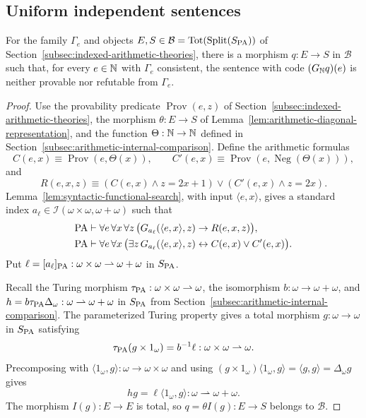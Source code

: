 \subsection{Uniform independent sentences}
\label{subsec:uniform-independent-sentences}

\begin{theorem}
\label{thm:uniform-independent-sentences}
For the family $\Gamma_e$ and objects
$E,S\in\mathcal B=\operatorname{Tot}(\operatorname{Split}(S_{\mathrm{PA}}))$ of
Section~\ref{subsec:indexed-arithmetic-theories}, there is a morphism
$q:E\to S$ in $\mathcal B$ such that,
for every $e\in\mathbb N$ with $\Gamma_e$ consistent, the
sentence with code $(G_{\mathbb N}q)(e)$ is neither provable nor
refutable from $\Gamma_e$.
\end{theorem}
\begin{proof}
Use the provability predicate $\operatorname{Prov}(e,z)$ of
Section~\ref{subsec:indexed-arithmetic-theories}, the morphism
$\theta:E\to S$ of Lemma~\ref{lem:arithmetic-diagonal-representation},
and the function $\Theta:\mathbb N\to\mathbb N$ defined in
Section~\ref{subsec:arithmetic-internal-comparison}.
Define the arithmetic formulas
\[
 C(e,x)\equiv\operatorname{Prov}(e,\Theta(x)),\qquad
 C'(e,x)\equiv\operatorname{Prov}(e,\operatorname{Neg}(\Theta(x))),
\]
and
\[
 R(e,x,z)\equiv
   (C(e,x)\land z=2x+1)\lor(C'(e,x)\land z=2x).
\]
Lemma~\ref{lem:syntactic-functional-search}, with input
$\langle e,x\rangle$, gives a standard index
$a_\ell\in\mathcal I(\omega\times\omega,\omega+\omega)$
such that
\[
 \begin{aligned}
 \mathrm{PA}&\vdash\forall e\,\forall x\,\forall z\,
   \bigl(G_{a_\ell}(\langle e,x\rangle,z)\to R(e,x,z)\bigr),\\
 \mathrm{PA}&\vdash\forall e\,\forall x\,
   \bigl(\exists z\,G_{a_\ell}(\langle e,x\rangle,z)
                     \leftrightarrow C(e,x)\lor C'(e,x)\bigr).
 \end{aligned}
\]
Put $\ell=[a_\ell]_{\mathrm{PA}}:\omega\times\omega\rightharpoonup
\omega+\omega$ in $S_{\mathrm{PA}}$.

Recall the Turing morphism
$\tau_{\mathrm{PA}}:\omega\times\omega\rightharpoonup\omega$,
the isomorphism $b:\omega\to\omega+\omega$, and
$h=b\tau_{\mathrm{PA}}\Delta_\omega:\omega\rightharpoonup\omega+\omega$
in $S_{\mathrm{PA}}$ from Section~\ref{subsec:arithmetic-internal-comparison}.
The parameterized Turing property gives a total morphism
$g:\omega\to\omega$ in $S_{\mathrm{PA}}$ satisfying
\[
 \tau_{\mathrm{PA}}(g\times1_\omega)=b^{-1}\ell:
                    \omega\times\omega\rightharpoonup\omega.
\]
Precomposing with $\langle1_\omega,g\rangle:\omega\to\omega\times\omega$
and using $(g\times1_\omega)\langle1_\omega,g\rangle
=\langle g,g\rangle=\Delta_\omega g$ gives
\[
 hg=\ell\langle1_\omega,g\rangle:
                  \omega\rightharpoonup\omega+\omega.
\]
The morphism $I(g):E\to E$ is total, so
$q=\theta I(g):E\to S$ belongs to $\mathcal B$.


\end{proof}
